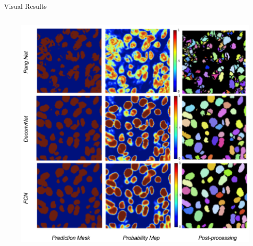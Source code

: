 \documentclass{beamer}
\begin{document}
\begin{frame}{Visual Results}
\begin{columns}
\begin{column}{0.3\textwidth}
\end{column}
\begin{column}{0.7\textwidth}
\includegraphics[width=1.1\textwidth]{Test}

\end{column}
\end{columns}
\end{frame}
\end{document}
